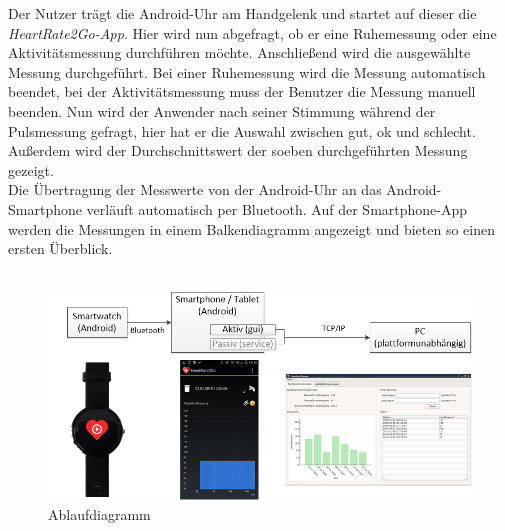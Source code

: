 Der Nutzer trägt die Android-Uhr am Handgelenk und startet auf dieser die \textit{HeartRate2Go-App}. Hier wird nun abgefragt, ob er eine Ruhemessung oder eine Aktivitätsmessung durchführen möchte. Anschließend wird die ausgewählte Messung durchgeführt. Bei einer Ruhemessung wird die Messung automatisch beendet, bei der Aktivitätsmessung muss der Benutzer die Messung manuell beenden. 
Nun wird der Anwender nach seiner Stimmung während der Pulsmessung gefragt, hier hat er die Auswahl zwischen gut, ok und schlecht. Außerdem wird der Durchschnittswert der soeben durchgeführten Messung gezeigt.\\
Die Übertragung der Messwerte von der Android-Uhr an das Android-Smartphone verläuft automatisch per Bluetooth. Auf der Smartphone-App werden die Messungen in einem Balkendiagramm angezeigt und bieten so einen ersten Überblick. \\
\\
\begin{figure} [H]
	\centering
		\includegraphics[scale=0.5]{images/ablauf.png}
		\caption{Ablaufdiagramm}
	\label{fig:ablauf}
\end{figure}

